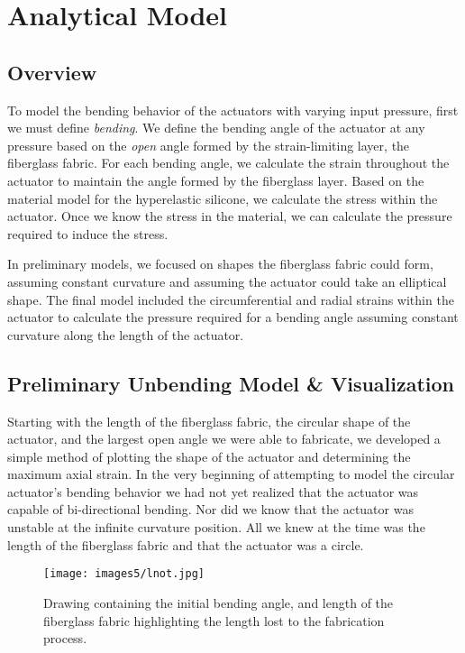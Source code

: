 \chapter{Analytical Model}

\section{Overview}
To model the bending behavior of the actuators with varying input pressure, first we must define \emph{bending}. We define the bending angle of the actuator at any pressure based on the \emph{open} angle formed by the strain-limiting layer, the fiberglass fabric. For each bending angle, we calculate the strain throughout the actuator to maintain the angle formed by the fiberglass layer. Based on the material model for the hyperelastic silicone, we calculate the stress within the actuator. Once we know the stress in the material, we can calculate the pressure required to induce the stress. 

In preliminary models, we focused on shapes the fiberglass fabric could form, assuming constant curvature and assuming the actuator could take an elliptical shape. The final model included the circumferential and radial strains within the actuator to calculate the pressure required for a bending angle assuming constant curvature along the length of the actuator. 

\section{Preliminary Unbending Model \& Visualization}

Starting with the length of the fiberglass fabric, the circular shape of the actuator, and the largest open angle we were able to fabricate, we developed a simple method of plotting the shape of the actuator and determining the maximum axial strain. In the very beginning of attempting to model the circular actuator's bending behavior we had not yet realized that the actuator was capable of bi-directional bending. Nor did we know that the actuator was unstable at the infinite curvature position. All we knew at the time was the length of the fiberglass fabric and that the actuator was a circle. 

\begin{figure}[h]
    \centering
    \texttt{[image: images5/lnot.jpg]}
    \caption{Drawing containing the initial bending angle, and length of the fiberglass fabric highlighting the length lost to the fabrication process.}
    \label{fig:lnot}
\end{figure}

